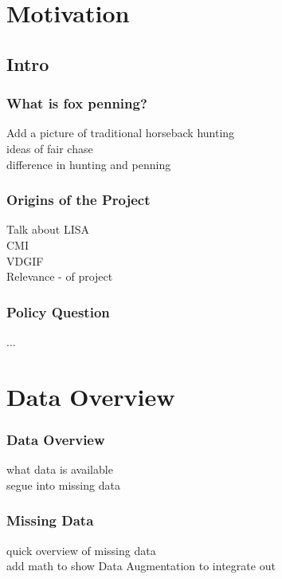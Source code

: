 \documentclass{beamer}
\begin{document}
\section{Motivation}
\subsection{Intro}
\begin{frame}
	\frametitle{What is fox penning?}
	Add a picture of traditional horseback hunting \\
	ideas of fair chase\\
	difference in hunting and penning\\
	
\end{frame}
\begin{frame}
	\frametitle{Origins of the Project}
	Talk about LISA \\
	CMI \\
	VDGIF\\
	Relevance - of project	
\end{frame}
\begin{frame}
	\frametitle{Policy Question}
...
\end{frame}
\section{Data Overview}
\begin{frame}
	\frametitle{Data Overview}
	what data is available \\
	segue into missing data
	\end{frame}

\begin{frame}
	\frametitle{Missing Data}
	quick overview of missing data \\
	add math to show Data Augmentation to integrate out
	\end{frame}
\end{document}
